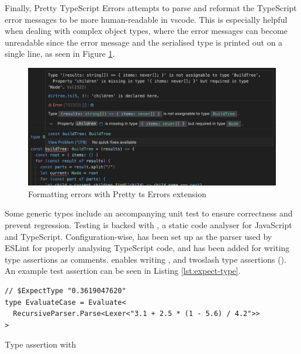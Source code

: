 Finally, Pretty TypeScript Errors \cite{balasianoPrettyTypeScriptErrors2023} attempts to parse and reformat the TypeScript error messages to be more human-readable in \acrshort{vscode}. This is especially helpful when dealing with complex object types, where the error messages can become unreadable since the error message and the serialised type is printed out on a single line, as seen in Figure \ref{fig:pretty-ts-errors}.


\begin{figure}[ht]
  \centering
  \includegraphics[width=\textwidth]{text/testing/pretty-ts-errors.png}
  \caption{Formatting errors with Pretty \acrshort{ts} Errors extension}
  \label{fig:pretty-ts-errors}
\end{figure}

Some generic types include an accompanying unit test to ensure correctness and prevent regression. Testing is backed with \cite{ESLint2023}, a static code analyser for JavaScript and TypeScript. Configuration-wise,  has been set up as the parser used by ESLint for properly analysing TypeScript code, and  has been added for writing type assertions as comments.  enables writing ,  and twoslash type assertions (). An example test assertion can be seen in Listing \ref{lst:expect-type}.

\begin{listing}[ht]
  \begin{verbatim}
// $ExpectType "0.3619047620"
type EvaluateCase = Evaluate<
  RecursiveParser.Parse<Lexer<"3.1 + 2.5 * (1 - 5.6) / 4.2">>
>
\end{verbatim}
  \caption{Type assertion with }\label{lst:expect-type}
\end{listing}
